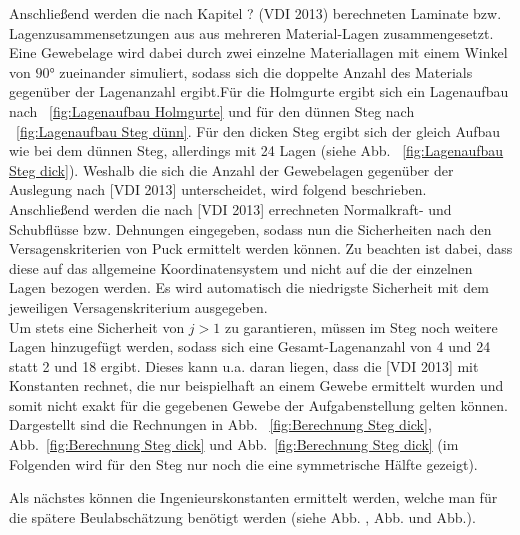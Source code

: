 \noindent Anschließend werden die nach Kapitel ? (VDI 2013) berechneten Laminate bzw. Lagenzusammensetzungen aus aus mehreren Material-Lagen zusammengesetzt. Eine Gewebelage wird dabei durch zwei einzelne Materiallagen mit einem Winkel von $90°$ zueinander simuliert, sodass sich die doppelte Anzahl des Materials gegenüber der Lagenanzahl ergibt.Für die Holmgurte ergibt sich ein Lagenaufbau nach ~\ref{fig:Lagenaufbau Holmgurte} und für den dünnen Steg nach ~\ref{fig:Lagenaufbau Steg dünn}. Für den dicken Steg ergibt sich der gleich Aufbau wie bei dem dünnen Steg, allerdings mit 24 Lagen (siehe Abb. ~\ref{fig:Lagenaufbau Steg dick}). Weshalb die sich die Anzahl der Gewebelagen gegenüber der Auslegung nach [VDI 2013] unterscheidet, wird folgend beschrieben.\\ 

\noindent Anschließend werden die nach [VDI 2013] errechneten Normalkraft- und Schubflüsse bzw. Dehnungen eingegeben, sodass nun die Sicherheiten nach den Versagenskriterien von Puck ermittelt werden können. Zu beachten ist dabei, dass diese auf das allgemeine Koordinatensystem und nicht auf die der einzelnen Lagen bezogen werden. Es wird automatisch die niedrigste Sicherheit mit dem jeweiligen Versagenskriterium ausgegeben.\\

\noindent Um stets eine Sicherheit von $j>1$ zu garantieren, müssen im Steg noch weitere Lagen hinzugefügt werden, sodass sich eine Gesamt-Lagenanzahl von 4 und 24 statt 2 und 18 ergibt. Dieses kann u.a. daran liegen, dass die [VDI 2013] mit Konstanten rechnet, die nur beispielhaft an einem Gewebe ermittelt wurden und somit nicht exakt für die gegebenen Gewebe der Aufgabenstellung gelten können.
Dargestellt sind die Rechnungen in Abb. ~\ref{fig:Berechnung Steg dick}, Abb.~\ref{fig:Berechnung Steg dick} und Abb.~\ref{fig:Berechnung Steg dick} (im Folgenden wird für den Steg nur noch die eine symmetrische Hälfte gezeigt).

Als nächstes können die Ingenieurskonstanten ermittelt werden, welche man für die spätere Beulabschätzung benötigt werden (siehe Abb. , Abb. und Abb.).